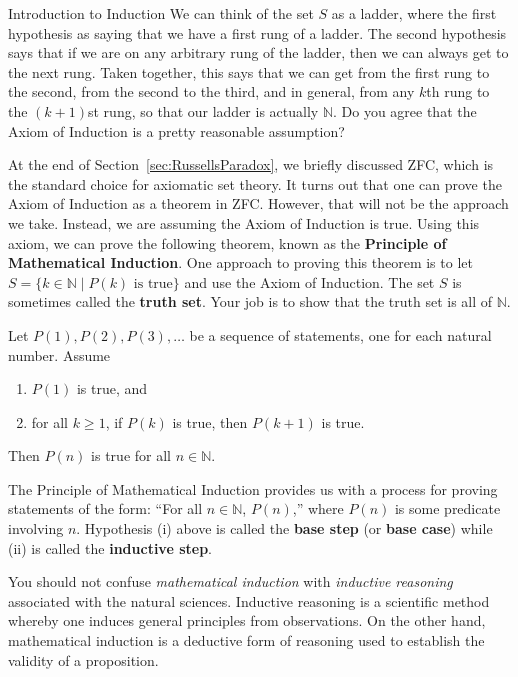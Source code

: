 \begin{section}{Introduction to Induction}
We can think of the set $S$ as a ladder, where the first hypothesis as saying that we have a first rung of a ladder.  The second hypothesis says that if we are on any arbitrary rung of the ladder, then we can always get to the next rung.  Taken together, this says that we can get from the first rung to the second, from the second to the third, and in general, from any $k$th rung to the $(k+1)$st rung, so that our ladder is actually $\mathbb{N}$. Do you agree that the Axiom of Induction is a pretty reasonable assumption?

At the end of Section~\ref{sec:RussellsParadox}, we briefly discussed ZFC, which is the standard choice for axiomatic set theory. It turns out that one can prove the Axiom of Induction as a theorem in ZFC.  However, that will not be the approach we take.  Instead, we are assuming the Axiom of Induction is true. Using this axiom, we can prove the following theorem, known as the \textbf{Principle of Mathematical Induction}. One approach to proving this theorem is to let $S=\{k\in \mathbb{N}\mid P(k) \text{ is true}\}$ and use the Axiom of Induction.  The set $S$ is sometimes called the \textbf{truth set}.  Your job is to show that the truth set is all of $\mathbb{N}$.

\begin{theorem}\label{thm:PMI}
Let $P(1), P(2), P(3), \ldots$ be a sequence of statements, one for each natural number. Assume
\begin{enumerate}[label=\textrm{(\roman*)}]
\item $P(1)$ is true, and
\item for all $k\geq 1$, if $P(k)$ is true, then $P(k+1)$ is true.
\end{enumerate}
Then $P(n)$ is true for all $n\in\mathbb{N}$.
\end{theorem}

The Principle of Mathematical Induction provides us with a process for proving statements of the form: ``For all $n\in\mathbb{N}$, $P(n)$,'' where $P(n)$ is some predicate involving $n$.  Hypothesis (i) above is called the \textbf{base step} (or \textbf{base case}) while (ii) is called the \textbf{inductive step}.

You should not confuse \emph{mathematical induction} with \emph{inductive reasoning} associated with the natural sciences. Inductive reasoning is a scientific method whereby one induces general principles from observations. On the other hand, mathematical induction is a deductive form of reasoning used to establish the validity of a proposition.


\end{section}
